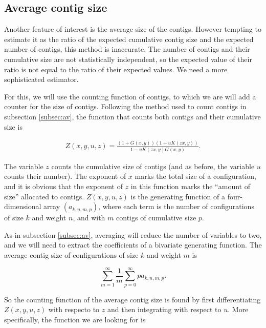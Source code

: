 \documentclass{article}
\begin{document}
\subsection{Average contig size}
\label{subsec:avctsz}

Another feature of interest is the average size of the contigs. However
tempting to estimate it as the ratio of the expected cumulative contig
size and the expected number of contigs, this method is inaccurate. The
number of contigs and their cumulative size are not statistically
independent, so the expected value of their ratio is not equal to the
ratio of their expected values. We need a more sophisticated estimator.

For this, we will use the counting function of contigs, to which we are
will add a counter for the size of contigs. Following the method used to
count contigs in subsection \ref{subsec:av}, the function that counts
both contigs and their cumulative size is

\begin{equation*}
\begin{split}
Z(x,y,u,z) = \frac{(1+G(x,y))(1+uK(zx,y))}{1-uK(zx,y)G(x,y)}.
\end{split}
\end{equation*}

The variable $z$ counts the cumulative size of contigs (and as before, the
variable $u$ counts their number). The exponent of $x$ marks the total
size of a configuration, and it is obvious that the exponent of $z$ in
this function marks the ``amount of size'' allocated to contigs.
$Z(x,y,u,z)$ is the generating function of a four-dimensional array
$(a_{k,n,m,p})$, where each term is the number of configurations of size
$k$ and weight $n$, and with $m$ contigs of cumulative size $p$.

As in subsection \ref{subsec:av}, averaging will reduce the number of
variables to two, and we will need to extract the coefficients of a
bivariate generating function. The average contig size of configurations
of size $k$ and weight $m$ is

\begin{equation*}
\sum_{m=1}^\infty\frac{1}{m}\sum_{p=0}^\infty pa_{k,n,m,p}.
\end{equation*}

So the counting function of the average contig size is found by first
differentiating $Z(x,y,u,z)$ with respecto to $z$ and then integrating
with respect to $u$. More specifically, the function we are looking for is
\end{document}
